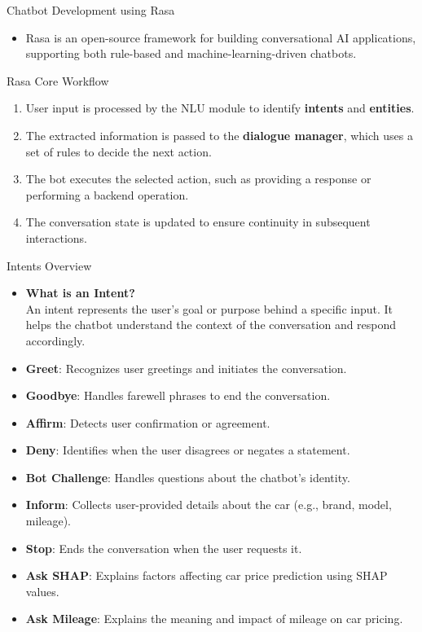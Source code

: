 \documentclass{beamer}
\begin{document}
\begin{frame}{Chatbot Development using Rasa}
    \begin{itemize}
        \item Rasa is an open-source framework for building conversational AI applications, supporting both rule-based and machine-learning-driven chatbots.
    \end{itemize}
    
    \begin{block}{Rasa Core Workflow}
        \begin{enumerate}
            \item User input is processed by the NLU module to identify \textbf{intents} and \textbf{entities}.
            \item The extracted information is passed to the \textbf{dialogue manager}, which uses a set of rules to decide the next action.
            \item The bot executes the selected action, such as providing a response or performing a backend operation.
            \item The conversation state is updated to ensure continuity in subsequent interactions.
        \end{enumerate}
    \end{block}
\end{frame}


\begin{frame}{Intents Overview}
    \begin{itemize}
        \item \textbf{What is an Intent?} \\
        An intent represents the user's goal or purpose behind a specific input. It helps the chatbot understand the context of the conversation and respond accordingly.
        
        \item \textbf{Greet}: Recognizes user greetings and initiates the conversation.
        \item \textbf{Goodbye}: Handles farewell phrases to end the conversation.
        \item \textbf{Affirm}: Detects user confirmation or agreement.
        \item \textbf{Deny}: Identifies when the user disagrees or negates a statement.
        \item \textbf{Bot Challenge}: Handles questions about the chatbot's identity.
        \item \textbf{Inform}: Collects user-provided details about the car (e.g., brand, model, mileage).
        \item \textbf{Stop}: Ends the conversation when the user requests it.
        \item \textbf{Ask SHAP}: Explains factors affecting car price prediction using SHAP values.
        \item \textbf{Ask Mileage}: Explains the meaning and impact of mileage on car pricing.
    \end{itemize}
\end{frame}
\end{document}
